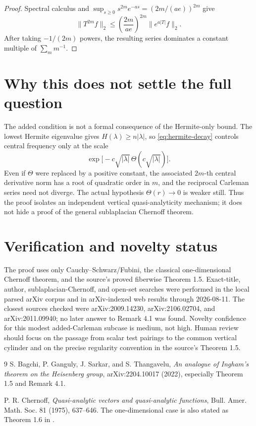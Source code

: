\documentclass[11pt]{article}
\newcommand{\Thetaf}{\Theta}
\begin{document}
\begin{proof}
Spectral calculus and
$\sup_{s\ge0}s^{2m}e^{-as}=(2m/(ae))^{2m}$ give
\[
 \|T^{2m}f\|_2
 \le \left(\frac{2m}{ae}\right)^{2m}\|e^{a|T|}f\|_2.
\]
After taking $-1/(2m)$ powers, the resulting series dominates a constant
multiple of $\sum_m m^{-1}$.
\end{proof}

\section*{Why this does not settle the full question}

The added condition is not a formal consequence of the Hermite-only bound.
The lowest Hermite eigenvalue gives $H(\lambda)\ge n|\lambda|$, so
\eqref{eq:hermite-decay} controls central frequency only at the scale
\[
 \exp\!\big[-c\sqrt{|\lambda|}\,
       \Thetaf(c\sqrt{|\lambda|})\big].
\]
Even if $\Thetaf$ were replaced by a positive constant, the associated
$2m$-th central derivative norm has a root of quadratic order in $m$, and
the reciprocal Carleman series need not diverge.  The actual hypothesis
$\Thetaf(r)\to0$ is weaker still.  Thus the proof isolates an independent
vertical quasi-analyticity mechanism; it does not hide a proof of the general
sublaplacian Chernoff theorem.

\section*{Verification and novelty status}

The proof uses only Cauchy--Schwarz/Fubini, the classical one-dimensional
Chernoff theorem, and the source's proved fiberwise Theorem 1.5.  Exact-title,
author, sublaplacian-Chernoff, and open-set searches were performed in the
local parsed arXiv corpus and in arXiv-indexed web results through
2026-08-11.  The closest sources checked were arXiv:2009.14230,
arXiv:2106.02704, and arXiv:2011.09940; no later answer to Remark 4.1 was
found.  Novelty confidence for this modest added-Carleman subcase is medium,
not high.  Human review should focus on the passage from scalar test pairings
to the common vertical cylinder and on the precise regularity convention in
the source's Theorem 1.5.

\begin{thebibliography}{9}
S. Bagchi, P. Ganguly, J. Sarkar, and S. Thangavelu,
\emph{An analogue of Ingham's theorem on the Heisenberg group},
arXiv:2204.10017 (2022), especially Theorem 1.5 and Remark 4.1.

P. R. Chernoff,
\emph{Quasi-analytic vectors and quasi-analytic functions},
Bull. Amer. Math. Soc. 81 (1975), 637--646.
The one-dimensional case is also stated as Theorem 1.6 in \cite{BGST}.
\end{thebibliography}
\end{document}
